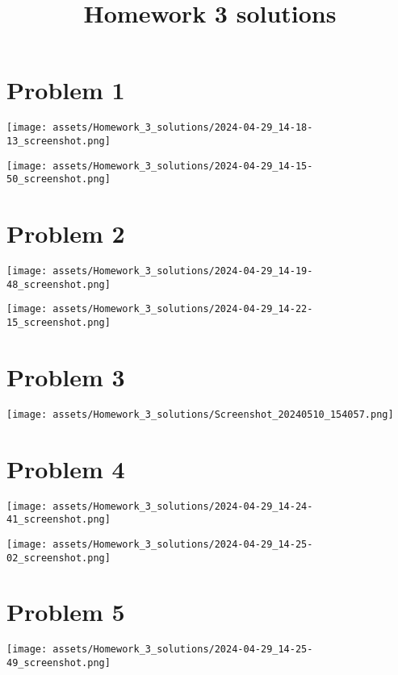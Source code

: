 \documentclass{amsart}
\date{}
\title{Homework 3 solutions}
\begin{document}
\maketitle
\section{Problem 1}
\label{sec:org36fc204}
\begin{center}
\texttt{[image: assets/Homework\_3\_solutions/2024-04-29\_14-18-13\_screenshot.png]}
\end{center}

\begin{center}
\texttt{[image: assets/Homework\_3\_solutions/2024-04-29\_14-15-50\_screenshot.png]}
\end{center}
\section{Problem 2}
\label{sec:org1fd3dbb}

\begin{center}
\texttt{[image: assets/Homework\_3\_solutions/2024-04-29\_14-19-48\_screenshot.png]}
\end{center}

\begin{center}
\texttt{[image: assets/Homework\_3\_solutions/2024-04-29\_14-22-15\_screenshot.png]}
\end{center}
\section{Problem 3}
\label{sec:org23c1bf5}
\begin{center}
\texttt{[image: assets/Homework\_3\_solutions/Screenshot\_20240510\_154057.png]}
\end{center}
\section{Problem 4}
\label{sec:org8e3610a}

\begin{center}
\texttt{[image: assets/Homework\_3\_solutions/2024-04-29\_14-24-41\_screenshot.png]}
\end{center}


\begin{center}
\texttt{[image: assets/Homework\_3\_solutions/2024-04-29\_14-25-02\_screenshot.png]}
\end{center}
\section{Problem 5}
\label{sec:orgb9f7dd3}

\begin{center}
\texttt{[image: assets/Homework\_3\_solutions/2024-04-29\_14-25-49\_screenshot.png]}
\end{center}
\end{document}
